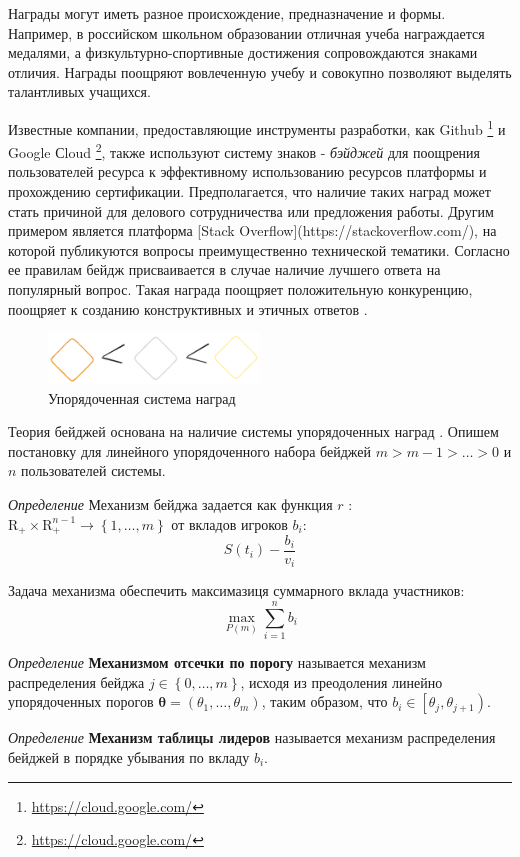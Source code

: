 Награды могут иметь разное происхождение, предназначение и формы. 
Например, в российском школьном образовании отличная учеба награждается медалями, а физкультурно-спортивные достижения сопровождаются знаками отличия.
Награды поощряют вовлеченную учебу и совокупно позволяют выделять талантливых учащихся. 

Известные компании, предоставляющие инструменты разработки, как Github \footnote{\url{https://cloud.google.com/}}
и Google Сloud \footnote{\url{https://cloud.google.com/}}, также используют систему знаков - \textit{бэйджей} 
для поощрения пользователей ресурса к эффективному использованию ресурсов платформы и прохождению сертификации. 
Предполагается, что наличие таких наград может стать причиной для делового сотрудничества или предложения работы. Другим примером является платформа [Stack Overflow](https://stackoverflow.com/),
на которой публикуются вопросы преимущественно технической тематики.
Согласно ее правилам бейдж присваивается в случае наличие лучшего ответа на популярный вопрос.
Такая награда поощряет положительную конкуренцию, поощряет к созданию конструктивных и этичных ответов \cite{yanovsky2021one}.
\begin{figure}[h]
    \centering
    \includegraphics[width=0.5\textwidth]{assets/pedagogic/social/badge.excalidraw.png}
    \caption{Упорядоченная система наград}
    \label{badge}
\end{figure}
Теория бейджей основана на наличие системы упорядоченных наград \cite{Easley2013}. Опишем постановку для линейного
упорядоченного набора бейджей $m > m-1 > \dots > 0$ и $n$  пользователей системы.

\textit{Определение} Механизм бейджа задается как функция $r$ : $\mathrm{R}_{+} \times \mathrm{R}_{+}^{n-1} \rightarrow \left\{1, \dots,m \right\}$ 
от вкладов игроков $b_i$:
\begin{equation}
    S(t_i) - \frac{b_i}{v_i}
\end{equation}

Задача механизма обеспечить максимазиця суммарного вклада участников:
\begin{equation}
    \max_{P(m)} \sum_{i=1}^n b_i
\end{equation}

\textit{Определение} \textbf{Механизмом отсечки по порогу} называется механизм распределения бейджа $j \in \left\{0,\dots,m\right\}$, исходя
из преодоления линейно упорядоченных порогов $\mathbf{\theta} =(\theta_1,\dots,\theta_m)$, таким образом, что $b_i \in \left[\theta_j,\theta_{j+1}\right)$.

\textit{Определение} \textbf{Механизм таблицы лидеров} называется механизм распределения бейджей в порядке убывания по вкладу $b_i$.






